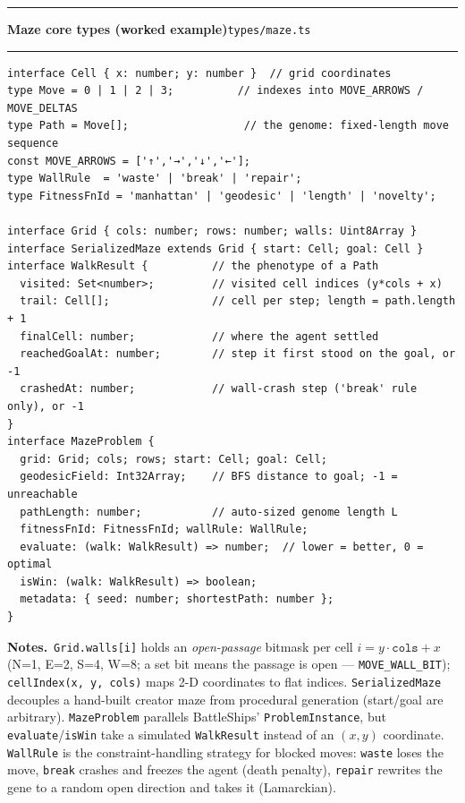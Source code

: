\documentclass[11pt,a4paper]{report}
\newcommand{\srcfile}[1]{\texttt{\small #1}}   %
\newcommand{\ts}[1]{\texttt{#1}}               %
\newenvironment{apientry}[2]{%
  \par\medskip\noindent
  \begin{minipage}{\textwidth}
  \hrule\vspace{0.6ex}
  {\large\ttfamily\bfseries #1}\hfill{\footnotesize\srcfile{#2}}
  \vspace{0.4ex}\hrule\medskip
}{%
  \end{minipage}\par\medskip
}
\newcommand{\apifield}[1]{\par\smallskip\noindent\textbf{#1.}\ }
\begin{document}
\begin{apientry}{Maze core types (worked example)}{types/maze.ts}
\begin{lstlisting}
interface Cell { x: number; y: number }  // grid coordinates
type Move = 0 | 1 | 2 | 3;          // indexes into MOVE_ARROWS / MOVE_DELTAS
type Path = Move[];                  // the genome: fixed-length move sequence
const MOVE_ARROWS = ['↑','→','↓','←'];
type WallRule  = 'waste' | 'break' | 'repair';
type FitnessFnId = 'manhattan' | 'geodesic' | 'length' | 'novelty';

interface Grid { cols: number; rows: number; walls: Uint8Array }
interface SerializedMaze extends Grid { start: Cell; goal: Cell }
interface WalkResult {          // the phenotype of a Path
  visited: Set<number>;         // visited cell indices (y*cols + x)
  trail: Cell[];                // cell per step; length = path.length + 1
  finalCell: number;            // where the agent settled
  reachedGoalAt: number;        // step it first stood on the goal, or -1
  crashedAt: number;            // wall-crash step ('break' rule only), or -1
}
interface MazeProblem {
  grid: Grid; cols; rows; start: Cell; goal: Cell;
  geodesicField: Int32Array;    // BFS distance to goal; -1 = unreachable
  pathLength: number;           // auto-sized genome length L
  fitnessFnId: FitnessFnId; wallRule: WallRule;
  evaluate: (walk: WalkResult) => number;  // lower = better, 0 = optimal
  isWin: (walk: WalkResult) => boolean;
  metadata: { seed: number; shortestPath: number };
}
\end{lstlisting}
\apifield{Notes}\ts{Grid.walls[i]} holds an \emph{open-passage} bitmask
per cell $i = y \cdot \ts{cols} + x$ (N=1, E=2, S=4, W=8; a set bit means
the passage is open --- \ts{MOVE\_WALL\_BIT}); \ts{cellIndex(x, y, cols)}
maps 2-D coordinates to flat indices. \ts{SerializedMaze} decouples a
hand-built creator maze from procedural generation (start/goal are
arbitrary). \ts{MazeProblem} parallels BattleShips'
\ts{ProblemInstance}, but \ts{evaluate}/\ts{isWin} take a simulated
\ts{WalkResult} instead of an $(x, y)$ coordinate. \ts{WallRule} is the
constraint-handling strategy for blocked moves: \ts{waste} loses the
move, \ts{break} crashes and freezes the agent (death penalty),
\ts{repair} rewrites the gene to a random open direction and takes it
(Lamarckian).
\end{apientry}
\end{document}
